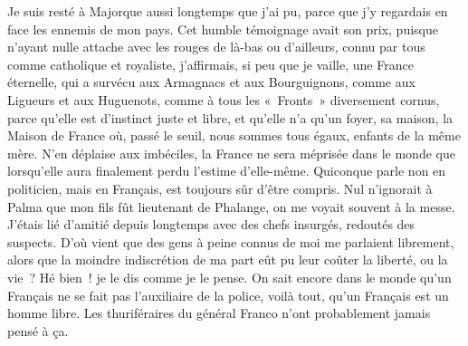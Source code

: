 \documentclass[french,twoside]{book} %
\newcommand{\astertri}{\medskip\par\centerline{\color{rubric}\large\selectfont{\syms ✻\,✻\,✻}}\medskip\par}%
\begin{document}
Je suis resté à Majorque aussi longtemps que j’ai pu, parce que j’y regardais en face les ennemis de mon pays. Cet humble témoignage avait son prix, puisque n’ayant nulle attache avec les rouges de là-bas ou d’ailleurs, connu par tous comme catholique et royaliste, j’affirmais, si peu que je vaille, une France éternelle, qui a survécu aux Armagnacs et aux Bourguignons, comme aux Ligueurs et aux Huguenots, comme à tous les « Fronts » diversement cornus, parce qu’elle est d’instinct juste et libre, et qu’elle n’a qu’un foyer, sa maison, la Maison de France où, passé le seuil, nous sommes tous égaux, enfants de la même mère. N’en déplaise aux imbéciles, la France ne sera méprisée dans le monde que lorsqu’elle aura finalement perdu l’estime d’elle-même. Quiconque parle non en politicien, mais en Français, est toujours sûr d’être compris. Nul n’ignorait à Palma que mon fils fût lieutenant de Phalange, on me voyait souvent à la messe. J’étais lié d’amitié depuis longtemps avec des chefs insurgés, redoutés des suspects. D’où vient que des gens à peine connus de moi me parlaient librement, alors que la moindre indiscrétion de ma part eût pu leur coûter la liberté, ou la vie ? Hé bien ! je le dis comme je le pense. On sait encore dans le monde qu’un Français ne se fait pas l’auxiliaire de la police, voilà tout, qu’un Français est un homme libre. Les thuriféraires du général Franco n’ont probablement jamais pensé à ça.\par
 \par

\astertri
\end{document}
